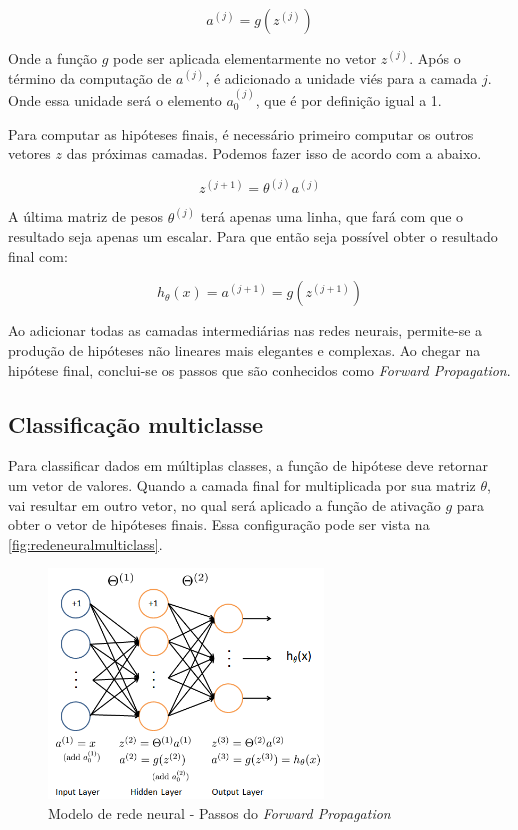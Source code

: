 \begin{equation} 
a^{(j)} = g(z^{(j)})  \nonumber
\end{equation}

Onde a função $g$ pode ser aplicada elementarmente no vetor $z^{(j)}$. Após o término da computação de $a^{(j)}$, é adicionado a unidade viés para a camada $j$. Onde essa unidade será o elemento $a_0^{(j)}$, que é por definição igual a 1.

Para computar as hipóteses finais, é necessário primeiro computar os outros vetores $z$ das próximas camadas. Podemos fazer isso de acordo com a abaixo.

\begin{equation}
z^{(j+1)} =  \theta^{(j)}a^{(j)} \nonumber
\end{equation}

A última matriz de pesos $\theta^{(j)}$ terá apenas uma linha, que fará com que o resultado seja apenas um escalar. Para que então seja possível obter o resultado final com:

\begin{equation} 
h_{\theta}(x) = a^{(j+1)} = g(z^{(j+1)}) \nonumber
\end{equation}

Ao adicionar todas as camadas intermediárias nas redes neurais, permite-se a produção de hipóteses não lineares mais elegantes e complexas. Ao chegar na hipótese final, conclui-se os passos que são conhecidos como \textit{Forward Propagation}.


\subsection{Classificação multiclasse}\label{subsec:clasmultirn}

Para classificar dados em múltiplas classes, a função de hipótese deve retornar um vetor de valores. Quando a camada final for multiplicada por sua matriz $\theta$, vai resultar em outro vetor, no qual será aplicado a função de ativação $g$ para obter o vetor de hipóteses finais. Essa configuração pode ser vista na \autoref{fig:redeneuralmulticlass}.

\begin{figure}
\centering
\caption{Modelo de rede neural - Passos do \textit{Forward Propagation}} \label{fig:redeneuralmulticlass}
\includegraphics[width=0.65\textwidth]{img/redeneuralmulticlass}
\end{figure}

